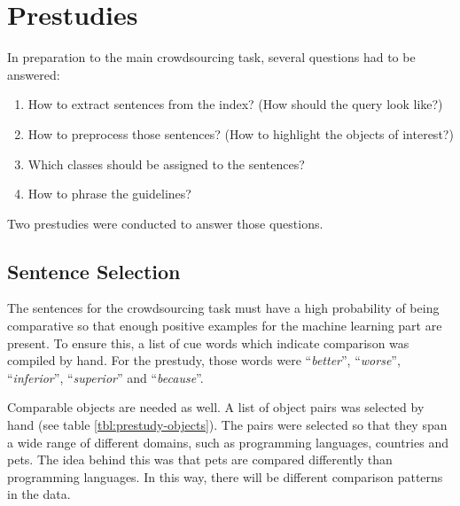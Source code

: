 \section{Prestudies}
In preparation to the main crowdsourcing task, several questions had to be answered:
\begin{enumerate}
\item How to extract sentences from the index? (How should the query look like?)
\item How to preprocess those sentences? (How to highlight the objects of interest?)
\item Which classes should be assigned to the sentences?
\item How to phrase the guidelines?
\end{enumerate}

Two prestudies were conducted to answer those questions.



\subsection{Sentence Selection}
The sentences for the crowdsourcing task must have a high probability of being comparative so that enough positive examples for the machine learning part are present. To ensure this, a list of cue words which indicate comparison was compiled by hand. For the prestudy, those words were \enquote{\emph{better}}, \enquote{\emph{worse}}, \enquote{\emph{inferior}}, \enquote{\emph{superior}} and \enquote{\emph{because}}. 

Comparable objects are needed as well. A list of object pairs was selected by hand (see table \ref{tbl:prestudy-objects}). The pairs were selected so that they span a wide range of different domains, such as programming languages, countries and pets. The idea behind this was that pets are compared differently than programming languages. In this way, there will be different comparison patterns in the data.

